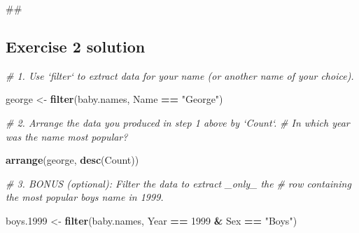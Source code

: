 \documentclass[]{book}
\newenvironment{Shaded}{\begin{snugshade}}{\end{snugshade}}
\newcommand{\KeywordTok}[1]{\textcolor[rgb]{0.13,0.29,0.53}{\textbf{#1}}}
\newcommand{\DecValTok}[1]{\textcolor[rgb]{0.00,0.00,0.81}{#1}}
\newcommand{\StringTok}[1]{\textcolor[rgb]{0.31,0.60,0.02}{#1}}
\newcommand{\CommentTok}[1]{\textcolor[rgb]{0.56,0.35,0.01}{\textit{#1}}}
\newcommand{\OperatorTok}[1]{\textcolor[rgb]{0.81,0.36,0.00}{\textbf{#1}}}
\newcommand{\NormalTok}[1]{#1}
\begin{document}
\begin{Shaded}
\begin{Highlighting}[]
\NormalTok{##}
\end{Highlighting}
\end{Shaded}

\subsection{Exercise 2 solution}\label{exercise-2-solution}

\begin{Shaded}
\begin{Highlighting}[]
\CommentTok{# 1.  Use `filter` to extract data for your name (or another name of your choice).  }
\end{Highlighting}
\end{Shaded}

\begin{Shaded}
\begin{Highlighting}[]
\NormalTok{george <-}\StringTok{ }\KeywordTok{filter}\NormalTok{(baby.names, Name }\OperatorTok{==}\StringTok{ "George"}\NormalTok{)}
\end{Highlighting}
\end{Shaded}

\begin{Shaded}
\begin{Highlighting}[]
\CommentTok{# 2.  Arrange the data you produced in step 1 above by `Count`. }
\CommentTok{#     In which year was the name most popular?}
\end{Highlighting}
\end{Shaded}

\begin{Shaded}
\begin{Highlighting}[]
\KeywordTok{arrange}\NormalTok{(george, }\KeywordTok{desc}\NormalTok{(Count))}
\end{Highlighting}
\end{Shaded}

\begin{Shaded}
\begin{Highlighting}[]
\CommentTok{# 3.  BONUS (optional): Filter the data to extract _only_ the }
\CommentTok{#     row containing the most popular boys name in 1999.}
\end{Highlighting}
\end{Shaded}

\begin{Shaded}
\begin{Highlighting}[]
\NormalTok{boys.}\DecValTok{1999}\NormalTok{ <-}\StringTok{ }\KeywordTok{filter}\NormalTok{(baby.names, }
\NormalTok{                    Year }\OperatorTok{==}\StringTok{ }\DecValTok{1999} \OperatorTok{&}\StringTok{ }\NormalTok{Sex }\OperatorTok{==}\StringTok{ "Boys"}\NormalTok{)}
\end{Highlighting}
\end{Shaded}
\end{document}
